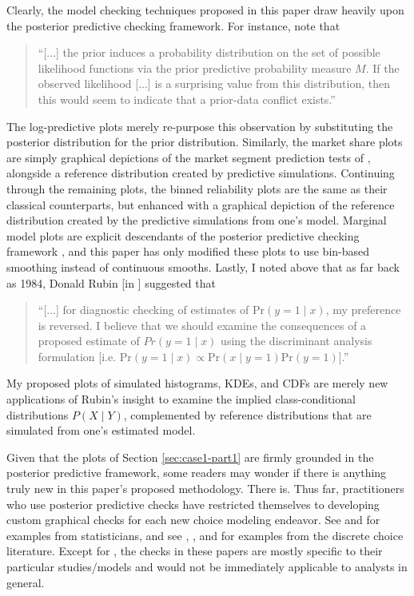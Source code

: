 \documentclass[preprint]{elsarticle}
\begin{document}
Clearly, the model checking techniques proposed in this paper draw heavily upon the posterior predictive checking framework. For instance, \citet[p. 896]{evans_checking_2006} note that
\begin{quote}
``[...] the prior induces a probability distribution on the set of possible likelihood functions via the prior predictive probability measure $M$. If the observed likelihood [...] is a surprising value from this distribution, then this would seem to indicate that a prior-data conflict exists.''
\end{quote}
The log-predictive plots merely re-purpose this observation by substituting the posterior distribution for the prior distribution. Similarly, the market share plots are simply graphical depictions of the market segment prediction tests of \citet[Section 7.6]{ben-akiva_discrete_1985}, alongside a reference distribution created by predictive simulations. Continuing through the remaining plots, the binned reliability plots are the same as their classical counterparts, but enhanced with a graphical depiction of the reference distribution created by the predictive simulations from one's model. Marginal model plots are explicit descendants of the posterior predictive checking framework \citep[pp.266-267]{pardoe_2002_graphical}, and this paper has only modified these plots to use bin-based smoothing instead of continuous smooths. Lastly, I noted above that as far back as 1984, Donald Rubin [in \citet[pp. 79-80]{landwehr_graphical_1984}] suggested that
\begin{quote}
``[...] for diagnostic checking of estimates of $\textrm{Pr} \left( y = 1 \mid x \right)$, my preference is reversed. I believe that we should examine the consequences of a proposed estimate of $Pr \left( y = 1 \mid x \right)$ using the discriminant analysis formulation [i.e. $\textrm{Pr} \left( y = 1 \mid x \right) \propto \textrm{Pr} \left( x \mid y = 1  \right) \textrm{Pr} \left( y = 1 \right)$].''
\end{quote}
My proposed plots of simulated histograms, KDEs, and CDFs are merely new applications of Rubin's insight to examine the implied class-conditional distributions $P \left( X \mid Y \right)$, complemented by reference distributions that are simulated from one's estimated model.

Given that the plots of Section \ref{sec:case1-part1} are firmly grounded in the posterior predictive framework, some readers may wonder if there is anything truly new in this paper's proposed methodology. There is. Thus far, practitioners who use posterior predictive checks have restricted themselves to developing custom graphical checks for each new choice modeling endeavor. See \citet{gelman_diagnostic_2000} and \citet{carlin_case_2001} for examples from statisticians, and see \citet{jedidi_measuring_2003}, \citet{musalem_coupon_2008}, and \citet{gilbride_posterior_2010} for examples from the discrete choice literature. Except for \citet{jedidi_measuring_2003}, the checks in these papers are mostly specific to their particular studies/models and would not be immediately applicable to analysts in general.
\end{document}

